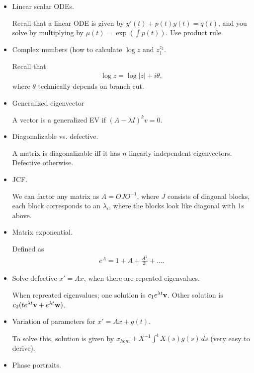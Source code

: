 \documentclass{article}
\begin{document}
\begin{itemize}
  \item Linear scalar ODEs.

    Recall that a linear ODE is given by $y'(t) + p(t) y(t) = q(t)$, and you solve by multiplying by $\mu(t) = \exp (\int p(t))$.  Use product rule.

  \item Complex numbers (how to calculate $\log z$ and $z_1^{z_2}$.

      Recall that
      \begin{align*}
        \log z = \log |z| + i \theta,
      \end{align*}
      where $\theta$ technically depends on branch cut.

  \item Generalized eigenvector

    A vector is a generalized EV if $(A - \lambda I)^k v = 0$.
  \item Diagonalizable vs. defective.

    A matrix is diagonalizable iff it has $n$ linearly independent eigenvectors.  Defective otherwise.

  \item JCF.

    We can factor any matrix as $A = O J O^{-1}$, where $J$ consists of diagonal blocks, each block corresponds to an $\lambda_i$, where the blocks look like diagonal with 1s above.

  \item Matrix exponential.

    Defined as
    \begin{align*}
      e^{A} = 1 + A + \frac{A^2}{2!} + \dots .
    \end{align*}

  \item Solve defective $x' = Ax$, when there are repeated eigenvalues.

    When repreated eigenvalues; one solution is $c_1 e^{\lambda t} \mathbf{v}$.  Other solution is $c_2 (t e^{\lambda t} \mathbf{v} + e^{\lambda t} \mathbf{w})$.

  \item Variation of parameters for $x' = Ax + g(t)$.

    To solve this, solution is given by $x_{hom} + X^{-1} \int^{t} X(s) g(s) \, ds$ (very easy to derive).

  \item Phase portraits. 
\end{itemize}
\end{document}
